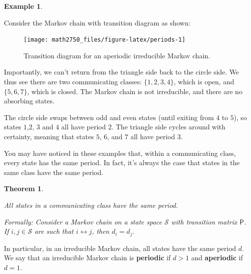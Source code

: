 \documentclass[
  a4paper,
]{article}
\newtheorem{theorem}{Theorem}[section]
\theoremstyle{definition}
\theoremstyle{definition}
\newtheorem{example}{Example}[section]
\theoremstyle{definition}
\theoremstyle{remark}
\begin{document}
\begin{example}
\protect\hypertarget{exm:weird-period}{}\label{exm:weird-period}

Consider the Markov chain with transition diagram as shown:

\begin{figure}

{\centering \texttt{[image: math2750\_files/figure-latex/periods-1]} 

}

\caption{Transition diagram for an aperiodic irreducible Markov chain.}\label{fig:periods}
\end{figure}

Importantly, we can't return from the triangle side back to the circle side. We thus see there are two communicating classes: \(\{1,2,3,4\}\), which is open, and \(\{5,6,7\}\), which is closed. The Markov chain is not irreducible, and there are no absorbing states.

The circle side swaps between odd and even states (until exiting from \(4\) to \(5\)), so states \(1\),\(2\), \(3\) and \(4\) all have period \(2\). The triangle side cycles around with certainty, meaning that states \(5\), \(6\), and \(7\) all have period \(3\).

\end{example}

You may have noticed in these examples that, within a communicating class, every state has the same period. In fact, it's always the case that states in the same class have the same period.

\begin{theorem}
\protect\hypertarget{thm:class-period}{}\label{thm:class-period}

All states in a communicating class have the same period.

Formally: Consider a Markov chain on a state space \(\mathcal S\) with transition matrix \(\mathsf P\). If \(i,j\in\mathcal S\) are such that \(i \leftrightarrow j\), then \(d_i = d_j\).

\end{theorem}

In particular, in an irreducible Markov chain, all states have the same period \(d\). We say that an irreducible Markov chain is \textbf{periodic} if \(d>1\) and \textbf{aperiodic} if \(d=1\).
\end{document}
